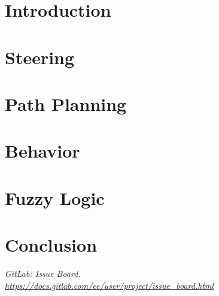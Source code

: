 \documentclass[12pt, a4paper]{article}
\begin{document}
	\section{Introduction}\label{sec:intro}
	
	\newpage
	\section{Steering}\label{sec:steering}
	
	\newpage
	\section{Path Planning}
	
	\newpage
	\section{Behavior}
	
	\newpage
	\section{Fuzzy Logic}
	
	\newpage
	\section{Conclusion}\label{sec:planning}
	
	\newpage
	\appendix
	\begin{thebibliography}{9}
	  	\textit{GitLab: Issue Board}.
	  		\\\textit{\url{https://docs.gitlab.com/ee/user/project/issue_board.html}}
	  
	\end{thebibliography}
\end{document}
